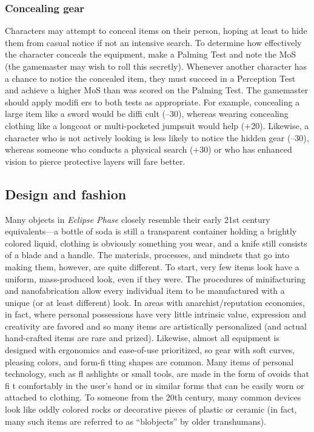 \subsubsection{Concealing gear}

Characters may attempt to conceal items on their
person, hoping at least to hide them from casual
notice if not an intensive search. To determine how
effectively the character conceals the equipment, make
a Palming Test and note the MoS (the gamemaster
may wish to roll this secretly). Whenever another
character has a chance to notice the concealed item,
they must succeed in a Perception Test and achieve
a higher MoS than was scored on the Palming Test.
The gamemaster should apply modifi ers to both tests
as appropriate. For example, concealing a large item
like a sword would be diffi cult (–30), whereas wearing
concealing clothing like a longcoat or multi-pocketed
jumpsuit would help (+20). Likewise, a character
who is not actively looking is less likely to notice the
hidden gear (–30), whereas someone who conducts a
physical search (+30) or who has enhanced vision to
pierce protective layers will fare better.


\subsection{Design and fashion}
\label{sec:design-fashion}

Many objects in \emph{Eclipse Phase} closely resemble their
early 21st century equivalents—a bottle of soda is still
a transparent container holding a brightly colored
liquid, clothing is obviously something you wear, and
a knife still consists of a blade and a handle. The materials,
processes, and mindsets that go into making
them, however, are quite different. To start, very few
items look have a uniform, mass-produced look, even
if they were. The procedures of minifacturing and
nanofabrication allow every individual item to be
manufactured with a unique (or at least different)
look. In areas with anarchist/reputation economies, in
fact, where personal possessions have very little intrinsic
value, expression and creativity are favored and so
many items are artistically personalized (and actual
hand-crafted items are rare and prized). Likewise,
almost all equipment is designed with ergonomics
and ease-of-use prioritized, so gear with soft curves,
pleasing colors, and form-fi tting shapes are common.
Many items of personal technology, such as fl ashlights
or small tools, are made in the form of ovoids that
fi t comfortably in the user’s hand or in similar forms
that can be easily worn or attached to clothing. To
someone from the 20th century, many common
devices look like oddly colored rocks or decorative
pieces of plastic or ceramic (in fact, many such items
are referred to as “blobjects” by older transhumans).

